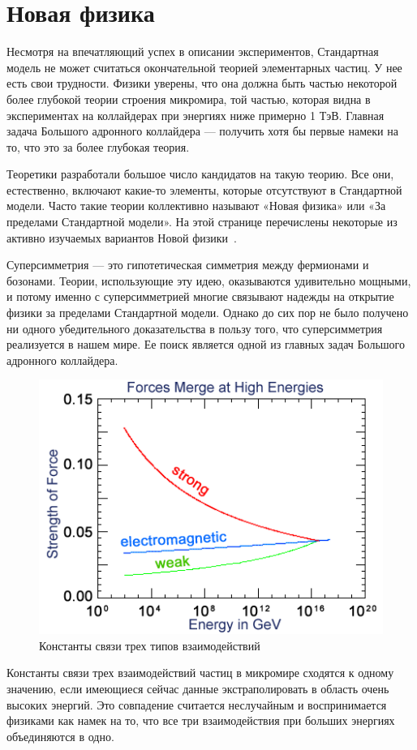 \section{Новая физика}

Несмотря на впечатляющий успех в описании экспериментов, Стандартная модель не может считаться окончательной теорией элементарных частиц. У нее есть свои трудности. Физики уверены, что она должна быть частью некоторой более глубокой теории строения микромира, той частью, которая видна в экспериментах на коллайдерах при энергиях ниже примерно 1 ТэВ. Главная задача Большого адронного коллайдера — получить хотя бы первые намеки на то, что это за более глубокая теория.

Теоретики разработали большое число кандидатов на такую теорию. Все они, естественно, включают какие-то элементы, которые отсутствуют в Стандартной модели. Часто такие теории коллективно называют «Новая физика» или «За пределами Стандартной модели». На этой странице перечислены некоторые из активно изучаемых вариантов Новой физики~\cite{2part-1}.

Суперсимметрия — это гипотетическая симметрия между фермионами и бозонами. Теории, использующие эту идею, оказываются удивительно мощными, и потому именно с суперсимметрией многие связывают надежды на открытие физики за пределами Стандартной модели. Однако до сих пор не было получено ни одного убедительного доказательства в пользу того, что суперсимметрия реализуется в нашем мире. Ее поиск является одной из главных задач Большого адронного коллайдера.
\begin{figure}[h]
	\centering
	\includegraphics[width=\textwidth]{figures/hep-sm.png}
	\caption{Константы связи трех типов взаимодействий}
	\label{fig:fig01}
\end{figure}
Константы связи трех взаимодействий частиц в микромире сходятся к одному значению, если имеющиеся сейчас данные экстраполировать в область очень высоких энергий. Это совпадение считается неслучайным и воспринимается физиками как намек на то, что все три взаимодействия при больших энергиях объединяются в одно.

